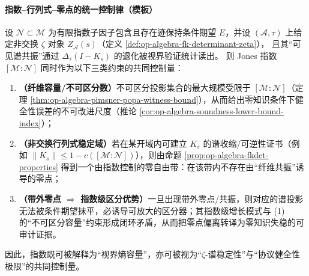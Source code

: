 \paragraph{指数--行列式--零点的统一控制律（模板）}
\begin{proposition}\label{prop:op-algebra-index-determinant-zero-control}
设 \(\mathcal{N}\subset\mathcal{M}\) 为有限指数子因子包含且存在迹保持条件期望 \(E\)，并设 \((\mathcal{A},\tau)\) 上给定非交换 \(\zeta\) 对象 \(Z_{\mathcal{A}}(s)\)（定义 \ref{def:op-algebra-fk-determinant-zeta}），
且其“可见谱共振”通过 \(\Delta_\tau(I-K_s)\) 的退化被视界验证统计读出。
则 Jones 指数 \([\mathcal{M}:\mathcal{N}]\) 同时作为以下三类约束的共同控制量：
\begin{enumerate}
  \item \textbf{（纤维容量/不可区分数）}不可区分投影集合的最大规模受限于 \([\mathcal{M}:\mathcal{N}]\)（定理 \ref{thm:op-algebra-pimsner-popa-witness-bound}），从而给出零知识条件下健全性误差的不可改进尺度（推论 \ref{cor:op-algebra-soundness-lower-bound-index}）；
  \item \textbf{（非交换行列式稳定域）}若在某开域内可建立 \(K_s\) 的谱收缩/可逆性证书（例如 \(\|K_s\|\le 1-c([\mathcal{M}:\mathcal{N}])\)），则由命题 \ref{prop:op-algebra-fkdet-properties} 得到一个由指数控制的零自由带：在该带内不存在由“纤维共振”诱导的零点；
  \item \textbf{（带外零点 \(\Rightarrow\) 指数级区分优势）}一旦出现带外零点/共振，则对应的谱投影无法被条件期望抹平，必诱导可放大的区分器；其指数级增长模式与 (1) 的“不可区分容量”约束形成闭环矛盾，从而把零点偏离转译为零知识失稳的可审计证据。
\end{enumerate}
因此，指数既可被解释为“视界熵容量”，亦可被视为“\(\zeta\)-谱稳定性”与“协议健全性极限”的共同控制量。
\end{proposition}

\endinput


